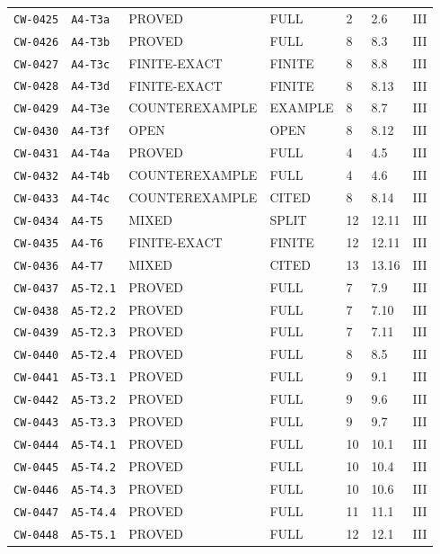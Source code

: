 \begin{center}
\begin{longtable}{@{}lllllll@{}}
\texttt{CW-0425} & \texttt{A4-T3a} & PROVED & FULL & 2 & 2.6 & III\\
\texttt{CW-0426} & \texttt{A4-T3b} & PROVED & FULL & 8 & 8.3 & III\\
\texttt{CW-0427} & \texttt{A4-T3c} & FINITE-EXACT & FINITE & 8 & 8.8 & III\\
\texttt{CW-0428} & \texttt{A4-T3d} & FINITE-EXACT & FINITE & 8 & 8.13 & III\\
\texttt{CW-0429} & \texttt{A4-T3e} & COUNTEREXAMPLE & EXAMPLE & 8 & 8.7 & III\\
\texttt{CW-0430} & \texttt{A4-T3f} & OPEN & OPEN & 8 & 8.12 & III\\
\texttt{CW-0431} & \texttt{A4-T4a} & PROVED & FULL & 4 & 4.5 & III\\
\texttt{CW-0432} & \texttt{A4-T4b} & COUNTEREXAMPLE & FULL & 4 & 4.6 & III\\
\texttt{CW-0433} & \texttt{A4-T4c} & COUNTEREXAMPLE & CITED & 8 & 8.14 & III\\
\texttt{CW-0434} & \texttt{A4-T5} & MIXED & SPLIT & 12 & 12.11 & III\\
\texttt{CW-0435} & \texttt{A4-T6} & FINITE-EXACT & FINITE & 12 & 12.11 & III\\
\texttt{CW-0436} & \texttt{A4-T7} & MIXED & CITED & 13 & 13.16 & III\\
\texttt{CW-0437} & \texttt{A5-T2.1} & PROVED & FULL & 7 & 7.9 & III\\
\texttt{CW-0438} & \texttt{A5-T2.2} & PROVED & FULL & 7 & 7.10 & III\\
\texttt{CW-0439} & \texttt{A5-T2.3} & PROVED & FULL & 7 & 7.11 & III\\
\texttt{CW-0440} & \texttt{A5-T2.4} & PROVED & FULL & 8 & 8.5 & III\\
\texttt{CW-0441} & \texttt{A5-T3.1} & PROVED & FULL & 9 & 9.1 & III\\
\texttt{CW-0442} & \texttt{A5-T3.2} & PROVED & FULL & 9 & 9.6 & III\\
\texttt{CW-0443} & \texttt{A5-T3.3} & PROVED & FULL & 9 & 9.7 & III\\
\texttt{CW-0444} & \texttt{A5-T4.1} & PROVED & FULL & 10 & 10.1 & III\\
\texttt{CW-0445} & \texttt{A5-T4.2} & PROVED & FULL & 10 & 10.4 & III\\
\texttt{CW-0446} & \texttt{A5-T4.3} & PROVED & FULL & 10 & 10.6 & III\\
\texttt{CW-0447} & \texttt{A5-T4.4} & PROVED & FULL & 11 & 11.1 & III\\
\texttt{CW-0448} & \texttt{A5-T5.1} & PROVED & FULL & 12 & 12.1 & III\\

\end{longtable}
\end{center}
